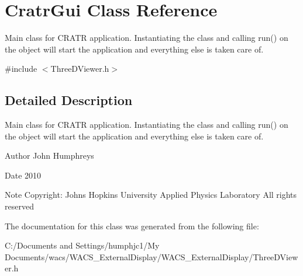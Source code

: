 \hypertarget{class_cratr_gui}{
\section{CratrGui Class Reference}
\label{class_cratr_gui}
}


Main class for CRATR application. Instantiating the class and calling run() on the object will start the application and everything else is taken care of.  




{\ttfamily \#include $<$ThreeDViewer.h$>$}



\subsection{Detailed Description}
Main class for CRATR application. Instantiating the class and calling run() on the object will start the application and everything else is taken care of. 

\begin{DoxyAuthor}{Author}
John Humphreys 
\end{DoxyAuthor}
\begin{DoxyDate}{Date}
2010 
\end{DoxyDate}
\begin{DoxyNote}{Note}
Copyright: Johns Hopkins University Applied Physics Laboratory All rights reserved 
\end{DoxyNote}


The documentation for this class was generated from the following file:\begin{DoxyCompactItemize}
\item 
C:/Documents and Settings/humphjc1/My Documents/wacs/WACS\_\-ExternalDisplay/WACS\_\-ExternalDisplay/ThreeDViewer.h\end{DoxyCompactItemize}

